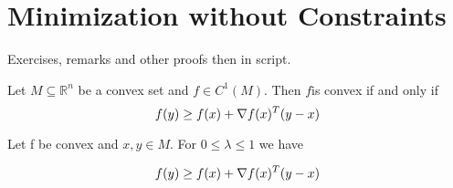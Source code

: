 
\newpage
\section{Minimization without Constraints}

\sometext
Exercises, remarks and other proofs then in script.


\lemma
Let $ M \subseteq \mathbb{R}^n $ be a convex set and $ f \in C^1(M) $. Then $ f $is convex if and only if
\[
    f(y) \ge f(x) + \nabla f(x)^T (y - x)
\]

\proof Let f be convex and $ x, y \in M $. For $ 0 \le \lambda \le 1 $ we have

\[
    f(y) \ge f(x) + \nabla f(x)^T (y - x)
\]

